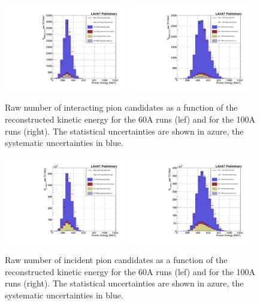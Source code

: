 \begin{figure}[p]
\centering  
\includegraphics[width=0.48\textwidth]{Chapter-6/Images/Plots60A_MCData_Int_StatSyst.pdf}
\includegraphics[width=0.48\textwidth]{Chapter-6/Images/Plots100A_MCData_Int_StatSyst.pdf}
\caption{Raw number of interacting pion candidates as a function of the reconstructed kinetic energy for the 60A runs (lef) and for the 100A runs (right). The statistical uncertainties are shown in azure, the systematic uncertainties in blue.}
\label{fig:InteractingRaw}
\end{figure}


\begin{figure}
\centering  
\includegraphics[width=0.48\textwidth]{Chapter-6/Images/Plots60A_MCData_Inc_StatSyst.pdf}
\includegraphics[width=0.48\textwidth]{Chapter-6/Images/Plots100A_MCData_Inc_StatSyst.pdf}
\caption{Raw number of incident pion candidates as a function of the reconstructed kinetic energy for the 60A runs (lef) and for the 100A runs (right). The statistical uncertainties are shown in azure, the systematic uncertainties in blue.}
\label{fig:IncidentRaw}
\end{figure}

